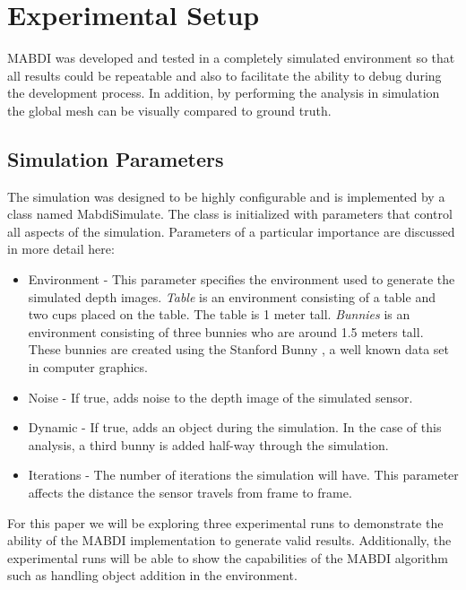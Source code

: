 \chapter{Experimental Setup}	\label{chapter:experimental_setup}

MABDI was developed and tested in a completely simulated environment
so that all results could be repeatable and also to facilitate the ability to
debug during the development process. In addition, by performing the analysis in
simulation the global mesh can be visually compared to ground truth.

\section{Simulation Parameters}

The simulation was designed to be highly configurable and is implemented by a
class named MabdiSimulate. The class is initialized with parameters that control
all aspects of the simulation. Parameters of a particular importance are
discussed in more detail here:

\begin{itemize}
    \item Environment - This parameter specifies the environment used to generate
    the simulated depth images. \textit{Table} is an environment consisting of a
    table and two cups placed on the table. The table is 1 meter tall.
    \textit{Bunnies} is an environment consisting of three bunnies who are
    around 1.5 meters tall. These bunnies are created using the Stanford Bunny
    \cite{Turk1994}, a well known data set in computer graphics.
    \item Noise - If true, adds noise to the depth image of the simulated sensor.
    \item Dynamic - If true, adds an object during the simulation. In the case
    of this analysis, a third bunny is added half-way through the simulation.
    \item Iterations - The number of iterations the simulation will have. This
    parameter affects the distance the sensor travels from frame to frame.
\end{itemize}

For this paper we will be exploring three experimental runs to demonstrate the
ability of the MABDI implementation to generate valid results. Additionally, the
experimental runs will be able to show the capabilities of the MABDI algorithm
such as handling object addition in the environment.

